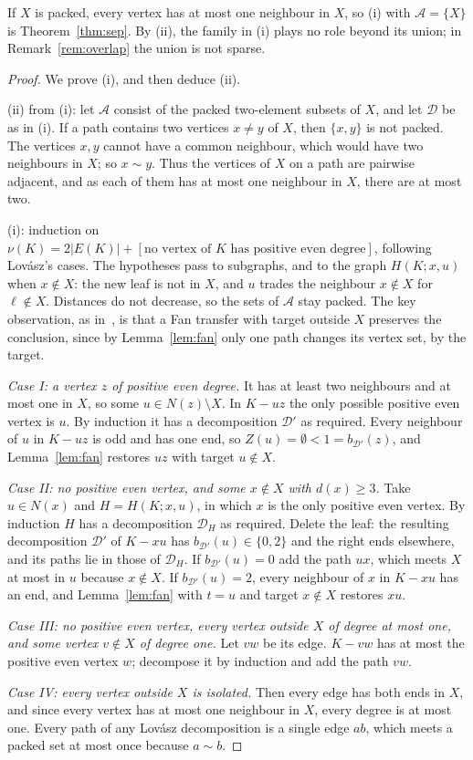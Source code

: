 \documentclass[11pt]{amsart}
\theoremstyle{definition}
\newcommand{\cA}{\mathcal A}
\newcommand{\cD}{\mathcal D}
\begin{document}
If $X$ is packed, every vertex has at most one neighbour in $X$, so (i) with $\cA=\{X\}$ is
Theorem~\ref{thm:sep}. By (ii), the family in (i) plays no role beyond its union; in
Remark~\ref{rem:overlap} the union is not sparse.

\begin{proof}
We prove (i), and then deduce (ii).

(ii) from (i): let $\cA$ consist of the packed two-element subsets of $X$, and let $\cD$ be as in (i). If a
path contains two vertices $x\ne y$ of $X$, then $\{x,y\}$ is not packed. The vertices $x,y$ cannot have
a common neighbour, which would have two neighbours in $X$; so $x\sim y$. Thus the vertices of $X$ on a path
are pairwise adjacent, and as each of them has at most one neighbour in $X$, there are at most two.

(i): induction on $\nu(K)=2|E(K)|+[\text{no vertex of }K\text{ has positive even degree}]$, following
Lov\'asz's cases. The hypotheses pass to subgraphs, and to the graph $H(K;x,u)$ when $x\notin X$: the new
leaf is not in $X$, and $u$ trades the neighbour $x\notin X$ for $\ell\notin X$. Distances do not decrease,
so the sets of $\cA$ stay packed. The key observation, as in~\cite{RD}, is that a Fan transfer with
target outside $X$ preserves the conclusion, since by Lemma~\ref{lem:fan} only one path changes its vertex
set, by the target.

\emph{Case I: a vertex $z$ of positive even degree.} It has at least two neighbours and at most one in
$X$, so some $u\in N(z)\setminus X$. In $K-uz$ the only possible positive even vertex is $u$. By induction it
has a decomposition $\cD'$ as required. Every neighbour of $u$ in $K-uz$ is odd and has one end, so
$Z(u)=\emptyset<1=b_{\cD'}(z)$, and Lemma~\ref{lem:fan} restores $uz$ with target $u\notin X$.

\emph{Case II: no positive even vertex, and some $x\notin X$ with $d(x)\ge3$.} Take $u\in N(x)$ and
$H=H(K;x,u)$, in which $x$ is the only positive even vertex. By induction $H$ has a decomposition $\cD_H$
as required. Delete the leaf: the resulting decomposition $\cD'$ of $K-xu$ has $b_{\cD'}(u)\in\{0,2\}$ and
the right ends elsewhere, and its paths lie in those of $\cD_H$. If $b_{\cD'}(u)=0$ add the path $ux$, which
meets $X$ at most in $u$ because $x\notin X$. If $b_{\cD'}(u)=2$, every neighbour of $x$ in $K-xu$ has an
end, and Lemma~\ref{lem:fan} with $t=u$ and target $x\notin X$ restores $xu$.

\emph{Case III: no positive even vertex, every vertex outside $X$ of degree at most one, and some vertex
$v\notin X$ of degree one.} Let $vw$ be its edge. $K-vw$ has at most the positive even vertex $w$; decompose
it by induction and add the path $vw$.

\emph{Case IV: every vertex outside $X$ is isolated.} Then every edge has both ends in $X$, and since every
vertex has at most one neighbour in $X$, every degree is at most one. Every path of any Lov\'asz
decomposition is a single edge $ab$, which meets a packed set at most once because $a\sim b$.
\end{proof}
\end{document}
